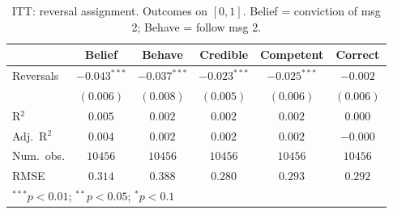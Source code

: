 
\begin{table}
\begin{center}
\begin{tabular}{l c c || c c || c}
\hline
 & Belief & Behave & Credible & Competent & Correct \\
\hline
Reversals   & $-0.043^{***}$ & $-0.037^{***}$ & $-0.023^{***}$ & $-0.025^{***}$ & $-0.002$  \\
            & $(0.006)$      & $(0.008)$      & $(0.005)$      & $(0.006)$      & $(0.006)$ \\
\hline
R$^2$       & $0.005$        & $0.002$        & $0.002$        & $0.002$        & $0.000$   \\
Adj.\ R$^2$ & $0.004$        & $0.002$        & $0.002$        & $0.002$        & $-0.000$  \\
Num.\ obs.  & $10456$        & $10456$        & $10456$        & $10456$        & $10456$   \\
RMSE        & $0.314$        & $0.388$        & $0.280$        & $0.293$        & $0.292$   \\
\hline
\multicolumn{6}{l}{\scriptsize{$^{***}p<0.01$; $^{**}p<0.05$; $^{*}p<0.1$}}
\end{tabular}
\caption{ITT: reversal assignment. Outcomes on $[0,1]$. Belief = conviction of msg 2; Behave = follow msg 2.}
\label{table:itt}
\end{center}
\end{table}

